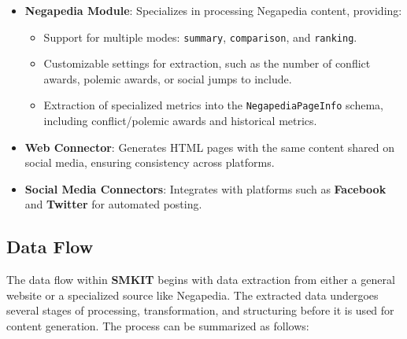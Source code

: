 \begin{itemize}
    \item \textbf{Negapedia Module}: Specializes in processing Negapedia content, providing:
        \begin{itemize}
            \item Support for multiple modes: \texttt{summary}, \texttt{comparison}, and \texttt{ranking}.
            \item Customizable settings for extraction, such as the number of conflict awards, polemic awards, or social jumps to include.
            \item Extraction of specialized metrics into the \texttt{NegapediaPageInfo} schema, including conflict/polemic awards and historical metrics.
        \end{itemize}

    \item \textbf{Web Connector}: Generates HTML pages with the same content shared on social media, ensuring consistency across platforms.
    \item \textbf{Social Media Connectors}: Integrates with platforms such as \textbf{Facebook} and \textbf{Twitter} for automated posting.
\end{itemize}

\subsection{Data Flow}
\label{subsec:data_flow}
The data flow within \textbf{SMKIT} begins with data extraction from either a general website or a specialized source like Negapedia. The extracted data undergoes several stages of processing, transformation, and structuring before it is used for content generation. The process can be summarized as follows:


